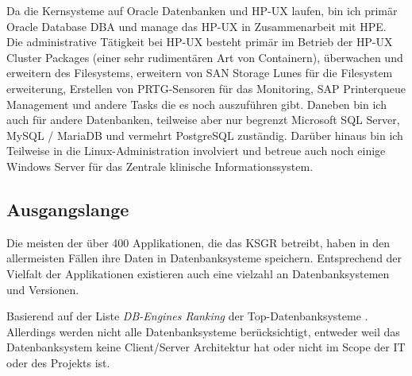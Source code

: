 \begin{flushleft}
    Da die Kernsysteme auf Oracle Datenbanken und \Gls{HP-UX} laufen, bin ich primär \Gls{Oracle Database} DBA und manage das \Gls{HP-UX} in Zusammenarbeit mit HPE.
    Die administrative Tätigkeit bei \Gls{HP-UX} besteht primär im Betrieb der \Gls{HP-UX} Cluster Packages (einer sehr
    rudimentären Art von Containern), überwachen und erweitern des Filesystems, erweitern von \Gls{SAN} Storage Lunes für die Filesystem erweiterung, Erstellen von \Gls{PRTG}-Sensoren für
    das Monitoring, SAP Printerqueue Management und andere Tasks die es noch auszuführen gibt.
    Daneben bin ich auch für andere Datenbanken, teilweise aber nur begrenzt \Gls{Microsoft SQL Server}, \Gls{MySQL} /
    \Gls{MariaDB} und vermehrt \Gls{PostgreSQL} zuständig.
    Darüber hinaus bin ich Teilweise in die \Gls{Linux}-Administration involviert und betreue auch noch einige Windows Server für das Zentrale klinische Informationssystem.
\end{flushleft}
\begin{flushleft}
    \subsection{Ausgangslange}
    Die meisten der über 400 Applikationen, die das KSGR betreibt, haben in den allermeisten Fällen ihre Daten in Datenbanksysteme speichern.
    Entsprechend der Vielfalt der Applikationen existieren auch eine vielzahl an Datenbanksystemen und Versionen.
\end{flushleft}
\begin{flushleft}
    Basierend auf der Liste \textit{DB-Engines Ranking}\cite{TTVGIG2P} der Top-Datenbanksysteme .
    Allerdings werden nicht alle Datenbanksysteme berücksichtigt, entweder weil das Datenbanksystem keine Client/Server Architektur hat oder nicht im Scope der IT oder des Projekts ist.
\end{flushleft}
